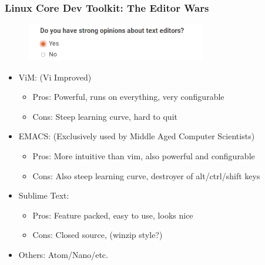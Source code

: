 \documentclass[landscape,10pt]{beamer}
\begin{document}
\begin{frame}[fragile]
\frametitle{Linux Core Dev Toolkit: The Editor Wars}
\begin{figure}[h]
    \centering
    \includegraphics[width=0.70\textwidth]{texteditors.png}
\end{figure}

\begin{itemize}
\item ViM: (Vi Improved)
\begin{itemize}
\item Pros: Powerful, runs on everything, very configurable
\item Cons: Steep learning curve, hard to quit 
\end{itemize}
\end{itemize}

\begin{itemize}
\item EMACS: (Exclusively used by Middle Aged Computer Scientists)
\begin{itemize}
\item Pros: More intuitive than vim, also powerful and configurable
\item Cons: Also steep learning curve, destroyer of alt/ctrl/shift keys
\end{itemize}
\end{itemize}

\begin{itemize}
\item Sublime Text:
\begin{itemize}
\item Pros: Feature packed, easy to use, looks nice
\item Cons: Closed source, (winzip style?)
\end{itemize}
\end{itemize}

\begin{itemize}
\item Others: Atom/Nano/etc.
\end{itemize}

\end{frame}
\end{document}
